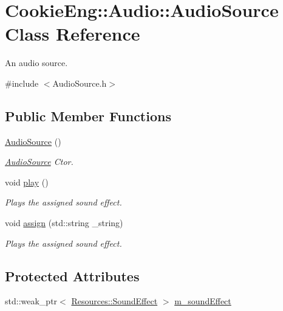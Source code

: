 \hypertarget{class_cookie_eng_1_1_audio_1_1_audio_source}{}\section{Cookie\+Eng\+:\+:Audio\+:\+:Audio\+Source Class Reference}
\label{class_cookie_eng_1_1_audio_1_1_audio_source}


An audio source.  




{\ttfamily \#include $<$Audio\+Source.\+h$>$}

\subsection*{Public Member Functions}
\begin{DoxyCompactItemize}
\item 
\hyperlink{class_cookie_eng_1_1_audio_1_1_audio_source_abf91fca0d4acf97b091efae22f3b4be8}{Audio\+Source} ()
\begin{DoxyCompactList}\small\item\em \hyperlink{class_cookie_eng_1_1_audio_1_1_audio_source}{Audio\+Source} Ctor. \end{DoxyCompactList}\item 
void \hyperlink{class_cookie_eng_1_1_audio_1_1_audio_source_a077bce5d4bc73b97f261e830558c5350}{play} ()
\begin{DoxyCompactList}\small\item\em Plays the assigned sound effect. \end{DoxyCompactList}\item 
void \hyperlink{class_cookie_eng_1_1_audio_1_1_audio_source_a36d0e1b2c5702eeb1fc63236ad19e6d4}{assign} (std\+::string \+\_\+string)
\begin{DoxyCompactList}\small\item\em Plays the assigned sound effect. \end{DoxyCompactList}\end{DoxyCompactItemize}
\subsection*{Protected Attributes}
\begin{DoxyCompactItemize}
\item 
std\+::weak\+\_\+ptr$<$ \hyperlink{class_cookie_eng_1_1_resources_1_1_sound_effect}{Resources\+::\+Sound\+Effect} $>$ \hyperlink{class_cookie_eng_1_1_audio_1_1_audio_source_af883ecb61be31c5e85f3666934080f4e}{m\+\_\+sound\+Effect}
\end{DoxyCompactItemize}


